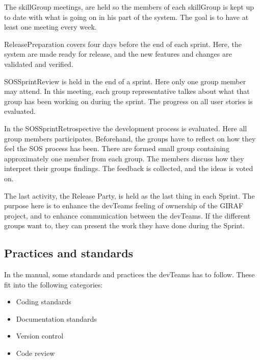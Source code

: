 The \Gls{skillGroup} meetings, are held so the members of each \gls{skillGroup} is kept up to date with what is going on in his part of the system. The goal is to have at least one meeting every week. 

\Gls{ReleasePreparation} covers four days before the end of each sprint. Here, the system are made ready for release, and the new features and changes are validated and verified. 

\Gls{SOSSprintReview} is held in the end of a sprint. Here only one group member may attend. In this meeting, each group representative talkes about what that group has been working on during the sprint. The progress on all user stories is evaluated. 

In the \gls{SOSSprintRetrospective} the development process is evaluated. Here all group members participates. Beforehand, the groups have to reflect on how they feel the \gls{SOS} process has been. There are formed small group containing approximately one member from each group. The members discuss how they interpret their groups findings. The feedback is collected, and the ideas is voted on. 

The last activity, the Release Party, is held as the last thing in each Sprint. The purpose here is to enhance the \glspl{devTeam} feeling of ownership of the GIRAF project, and to enhance communication between the \glspl{devTeam}. If the different groups want to, they can present the work they have done during the Sprint.

\subsection*{Practices and standards} 
In the manual, some standards and practices the \glspl{devTeam} has to follow. These fit into the following categories:
\begin{itemize}
    \item Coding standards
    \item Documentation standards
    \item Version control
    \item Code review
\end{itemize}

